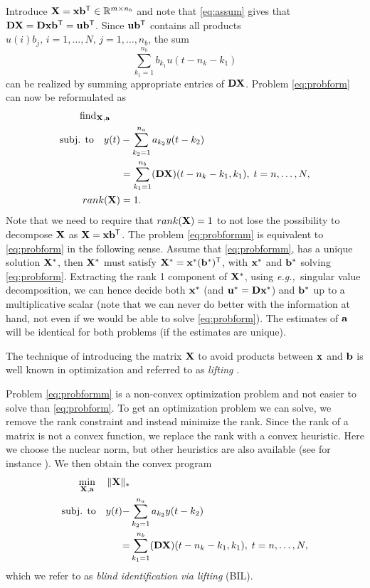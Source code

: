 \documentclass{ifacconf}
\newcommand{\T}{\mathsf{T}}
\renewcommand{\b}{{ b}}
\newcommand{\xx}{{\bf x}}
\newcommand{\DD}{{\bf D}}
\newcommand{\bb}{{\bf b}}
\renewcommand{\aa}{{\bf a}}
\newcommand{\uu}{{\bf  u}}
\newcommand{\X}{{\bf X}}
\newcommand{\0}{{\bf 0}}
\renewcommand{\a}{a}
\newcommand{\eg}{\textit{e.g.,~}}
\def\subjto{{\mbox{subj. to}}}
\renewcommand{\Re}{{\mathbb{R}}}
\begin{document}
Introduce 
$\X = \xx \bb^\T \in \Re ^ {m    \times n_b}$ and note that
\eqref{eq:assum} gives that $\DD
\X=\DD \xx \bb^\T=\uu \bb^\T$.  Since $\uu \bb^\T$ contains all
products  $u(i) b_j,\, i=1,\dots, N, \, j=1,\dots, n_b$, the sum 
\begin{equation}\sum_{k_1=1}^{n_b} 
\b_{k_1} u(t-n_k - k_1)\end{equation}
can be realized by summing appropriate entries of $\DD \X$.
Problem \eqref{eq:probform}  can  now be reformulated as
\begin{subequations}\label{eq:probformm}
\begin{align}\label{eq:probformm1}
\text{find}_{\X,\aa}  \quad   &\\ \nonumber
 \subjto \quad  y(t) &-\sum_{k_2=1}^{n_a} \a_{k_2} y(t-k_2)
\\   \label{eq:probformm2} \quad & = \sum_{k_1=1}^{n_b} (\DD\X)(t-n_k-k_1,k_1),\; t=n,\dots,N, \\ \quad  rank(\X) &=1.
\end{align}\end{subequations} 
Note that we need to require that $rank(\X)=1$ to not lose the
possibility to decompose $\X$ as $ \X=\xx \bb^\T$.
The problem \eqref{eq:probformm} is equivalent to \eqref{eq:probform}  in the following
sense. Assume that \eqref{eq:probformm}, has a unique solution $\X^*$,
then  $\X^*$ must satisfy
$\X^*=\xx^* (\bb^*)^\T$, with $\xx^*$ and $\bb^*$ solving
\eqref{eq:probform}. Extracting the rank 1 component of $\X^*$, using
\eg singular value decomposition, we can hence decide both $\xx^*$
(and $\uu^* =\DD \xx^*$) and
$\bb^*$  up to a multiplicative scalar (note that we can never do
better with the information at hand, not even if we would be able to
solve \eqref{eq:probform}). The estimates of $\aa$ will be
identical for both problems (if the estimates are unique). 

The technique of introducing
the matrix $\X$ to avoid products between $\xx$ and $\bb$ is well
known in optimization and referred to as \textit{lifting} \citep{shor87,Lovasz91,Nesterov98,Goemans:1995}.


Problem \eqref{eq:probformm} is  a
non-convex optimization problem and  not  easier to solve than
\eqref{eq:probform}. To get an optimization problem we can solve, we
 remove the rank
constraint and instead minimize the rank. Since the rank of a matrix is
not a convex function, we replace the rank with a convex
heuristic. Here we choose the nuclear norm, but other heuristics are
also available (see for instance \cite{Fazel01arank}).  We then obtain the convex
 program   \begin{subequations}\label{eq:probform3}
\begin{align}
\min_{\X, \aa}  \quad   \|\X\|_*& 
\\  \nonumber 
 \subjto \quad  y(t) -&\sum_{k_2=1}^{n_a} \a_{k_2}
 y(t-k_2) 
\\ \label{eq:probformm2} =& \sum_{k_1=1}^{n_b} (\DD \X)(t-n_k-k_1,k_1) , \;
 t=n,\dots,N,
\end{align}\end{subequations}which we refer to as \textit{blind identification via
  lifting} (BIL). 
\end{document}
